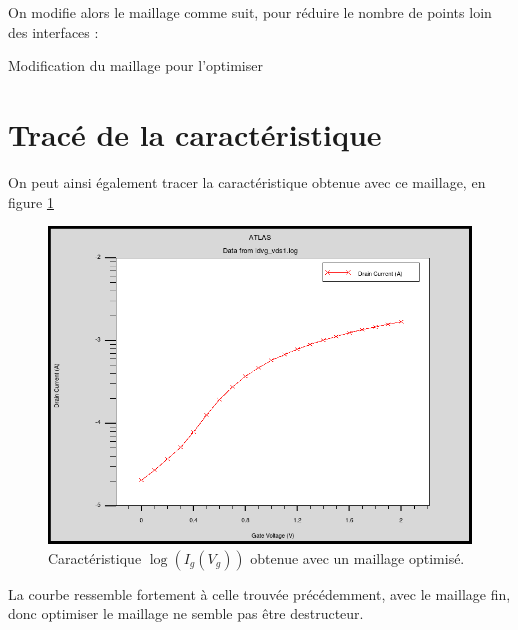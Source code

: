 \documentclass[a4paper,11pt]{report}
\begin{document}
\noindent On modifie alors le maillage comme suit, pour réduire le nombre de points loin des interfaces :

\begin{code}[H]
\noindent{}
\caption{Modification du maillage pour l'optimiser}
\end{code}
\newpage
\section{Tracé de la caractéristique}

On peut ainsi également tracer la caractéristique obtenue avec ce maillage, en figure \ref{logIdVgmeshopti}

\begin{figure}[H]
    \centering
    \includegraphics[width=340pt]{../meshOpti1/Log.png}
    \caption{Caractéristique $\log(I_g(V_g))$ obtenue avec un maillage optimisé.}
    \label{logIdVgmeshopti}
\end{figure}
 La courbe ressemble fortement à celle trouvée précédemment, avec le maillage fin, donc optimiser le maillage ne semble pas être destructeur.
\end{document}
